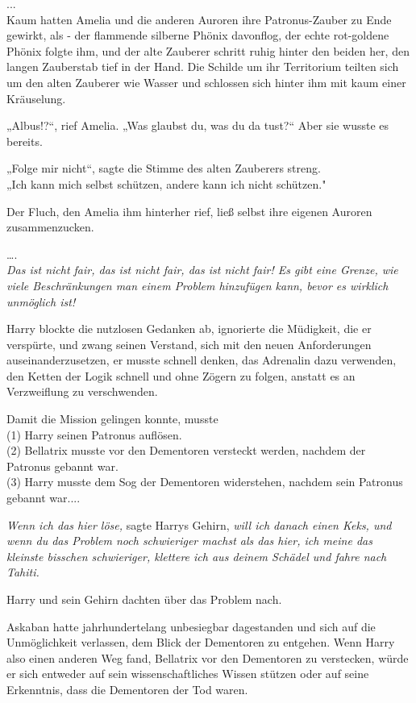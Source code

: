 {...\\ Kaum hatten Amelia und die anderen Auroren ihre Patronus-Zauber zu Ende gewirkt, als - der flammende silberne Phönix davonflog, der echte rot-goldene Phönix folgte ihm, und der alte Zauberer schritt ruhig hinter den beiden her, den langen Zauberstab tief in der Hand. Die Schilde um ihr Territorium teilten sich um den alten Zauberer wie Wasser und schlossen sich hinter ihm mit kaum einer Kräuselung.

„Albus!?“, rief Amelia. „Was glaubst du, was du da tust?“ Aber sie wusste es bereits.

„Folge mir nicht“, sagte die Stimme des alten Zauberers streng.\\ „Ich kann mich selbst schützen, andere kann ich nicht schützen."

Der Fluch, den Amelia ihm hinterher rief, ließ selbst ihre eigenen Auroren zusammenzucken.

….\\ \emph{Das ist nicht fair, das ist nicht fair, das ist nicht fair! Es gibt eine Grenze, wie viele Beschränkungen man einem Problem hinzufügen kann, bevor es wirklich unmöglich ist!}

Harry blockte die nutzlosen Gedanken ab, ignorierte die Müdigkeit, die er verspürte, und zwang seinen Verstand, sich mit den neuen Anforderungen auseinanderzusetzen, er musste schnell denken, das Adrenalin dazu verwenden, den Ketten der Logik schnell und ohne Zögern zu folgen, anstatt es an Verzweiflung zu verschwenden.

Damit die Mission gelingen konnte, musste\\ (1) Harry seinen Patronus auflösen.\\ (2) Bellatrix musste vor den Dementoren versteckt werden, nachdem der Patronus gebannt war.\\ (3) Harry musste dem Sog der Dementoren widerstehen, nachdem sein Patronus gebannt war....

\emph{Wenn ich das hier löse,} sagte Harrys Gehirn, \emph{will ich danach einen Keks, und wenn du das Problem noch schwieriger machst als das hier, ich meine das kleinste bisschen schwieriger, klettere ich aus deinem Schädel und fahre nach Tahiti.}

Harry und sein Gehirn dachten über das Problem nach.

Askaban hatte jahrhundertelang unbesiegbar dagestanden und sich auf die Unmöglichkeit verlassen, dem Blick der Dementoren zu entgehen. Wenn Harry also einen anderen Weg fand, Bellatrix vor den Dementoren zu verstecken, würde er sich entweder auf sein wissenschaftliches Wissen stützen oder auf seine Erkenntnis, dass die Dementoren der Tod waren.

}
